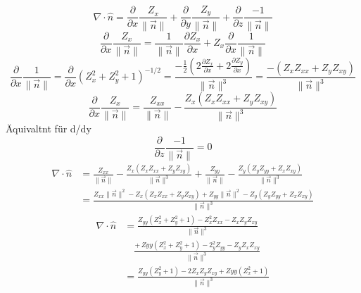 \begin{refsection}
\begin{equation}
\nabla \cdot \hat{n} = \frac{\partial}{\partial x} \frac{Z_x}{\|\vec{n}\|} + \frac{\partial}{\partial y} \frac{Z_y}{\|\vec{n}\|} + \frac{\partial}{\partial z}\frac{-1}{\|\vec{n}\|}
\end{equation}
\begin{equation}
\frac{\partial}{\partial x} \frac{Z_x}{\|\vec{n}\|} = \frac{1}{\|\vec{n}\|} \frac{\partial Z_x}{\partial x} + Z_x \frac{\partial}{\partial x} \frac{1}{\|\vec{n}\|}
\end{equation}
\begin{equation}
\frac{\partial}{\partial x} \frac{1}{\|\vec{n}\|} = \frac{\partial}{\partial x} (Z_x^2+Z_y^2+1)^{-1/2} = \frac{-\frac{1}{2} (2\frac{\partial Z_x}{\partial x} + 2\frac{\partial Z_y}{\partial x})}{\|\vec{n}\|^3} =\frac{-(Z_x Z_{xx}+Z_y Z_{xy})}{\|\vec{n}\|^3}
\end{equation}
\begin{equation}
\frac{\partial}{\partial x} \frac{Z_x}{\|\vec{n}\|} = \frac{Z_{xx}}{\|\vec{n}\|}-\frac{Z_x(Z_x Z_{xx} + Z_y Z_{xy})}{\|\vec{n}\|^3}
\end{equation}
Äquivaltnt für d/dy
\begin{equation}
\frac{\partial}{\partial z}\frac{-1}{\|\vec{n}\|}=0
\end{equation}
\begin{equation}
\begin{split}
\nabla \cdot \hat{n} &= \frac{Z_{xx}}{\|\vec{n}\|}-\frac{Z_x(Z_x Z_{xx} + Z_y Z_{xy})}{\|\vec{n}\|^3} + \frac{Z_{yy}}{\|\vec{n}\|}-\frac{Z_y(Z_y Z_{yy} + Z_x Z_{xy})}{\|\vec{n}\|^3} \\
&=\frac{Z_{xx}\|\vec{n}\|^2 - Z_x(Z_x Z_{xx} + Z_y Z_{xy}) + Z_{yy}\|\vec{n}\|^2 - Z_y(Z_y Z_{yy} + Z_x Z_{xy})}{\|\vec{n}\|^3}
\end{split}
\end{equation}
\begin{equation}
\begin{split}
\nabla \cdot \hat{n} &= \frac{Z_{yy}(Z_x^2+Z_y^2+1)-Z_x^2Z_{xx} - Z_xZ_yZ_{xy}}{\|\vec{n}\|^3} \\
& \quad \frac{+ \, Zyy(Z_x^2+Z_y^2+1)-2_y^2Z_{yy}-Z_yZ_xZ_{xy}}{\|\vec{n}\|^3} \\
&= \frac{Z_{yy}(Z_y^2+1) - 2 Z_xZ_yZ_{xy}+Zyy(Z_x^2+1)}{\|\vec{n}\|^3}
\end{split}
\end{equation}
\fi


\printbibliography[heading=subbibliography]
\end{refsection}
